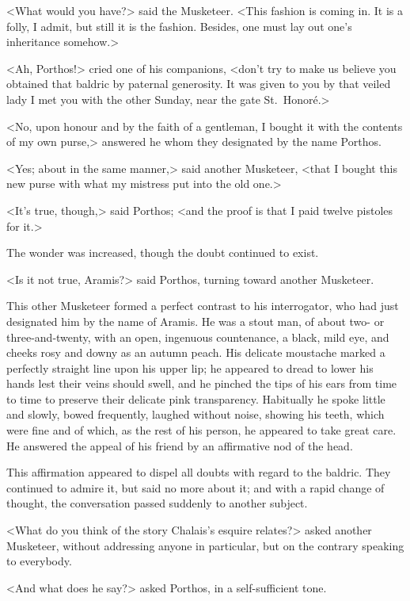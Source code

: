 <What would you have?> said the Musketeer. <This fashion is coming in. It is a folly, I admit, but still it is the fashion. Besides, one must lay out one's inheritance somehow.> 

<Ah, Porthos!> cried one of his companions, <don't try to make us believe you obtained that baldric by paternal generosity. It was given to you by that veiled lady I met you with the other Sunday, near the gate St.~Honoré.> 

<No, upon honour and by the faith of a gentleman, I bought it with the contents of my own purse,> answered he whom they designated by the name Porthos. 

<Yes; about in the same manner,> said another Musketeer, <that I bought this new purse with what my mistress put into the old one.> 

<It's true, though,> said Porthos; <and the proof is that I paid twelve pistoles for it.> 

The wonder was increased, though the doubt continued to exist. 

<Is it not true, Aramis?> said Porthos, turning toward another Musketeer. 

This other Musketeer formed a perfect contrast to his interrogator, who had just designated him by the name of Aramis. He was a stout man, of about two- or three-and-twenty, with an open, ingenuous countenance, a black, mild eye, and cheeks rosy and downy as an autumn peach. His delicate moustache marked a perfectly straight line upon his upper lip; he appeared to dread to lower his hands lest their veins should swell, and he pinched the tips of his ears from time to time to preserve their delicate pink transparency. Habitually he spoke little and slowly, bowed frequently, laughed without noise, showing his teeth, which were fine and of which, as the rest of his person, he appeared to take great care. He answered the appeal of his friend by an affirmative nod of the head. 

This affirmation appeared to dispel all doubts with regard to the baldric. They continued to admire it, but said no more about it; and with a rapid change of thought, the conversation passed suddenly to another subject. 

<What do you think of the story Chalais's esquire relates?> asked another Musketeer, without addressing anyone in particular, but on the contrary speaking to everybody. 

<And what does he say?> asked Porthos, in a self-sufficient tone. 

